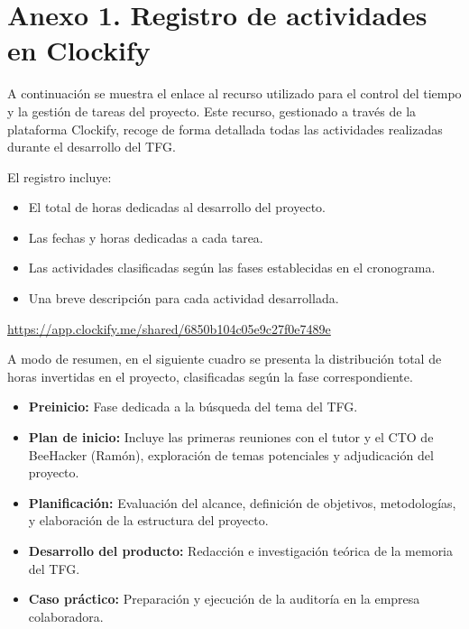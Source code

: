 \documentclass[a4paper, 11pt]{article}
\begin{document}
\thispagestyle{nohead}
\section*{Anexo 1. Registro de actividades en Clockify}
\label{anexo:1}

A continuación se muestra el enlace al recurso utilizado para el control del tiempo y la gestión de tareas del proyecto. Este recurso, gestionado a través de la plataforma Clockify, recoge de forma detallada todas las actividades realizadas durante el desarrollo del TFG. 

El registro incluye:
\begin{itemize}
  \item El total de horas dedicadas al desarrollo del proyecto.
  \item Las fechas y horas dedicadas a cada tarea.
  \item Las actividades clasificadas según las fases establecidas en el cronograma.
  \item Una breve descripción para cada actividad desarrollada.
\end{itemize}

\begin{tcolorbox}[enhanced,attach boxed title to top center={yshift=-3mm,yshifttext=-1mm},
  colback=blue!5!white,colframe=blue!75!black,colbacktitle=red!80!black,
  title=Dirección URL,fonttitle=\bfseries,
  boxed title style={size=small,colframe=red!50!black} ]
  \centering
  \url{https://app.clockify.me/shared/6850b104c05e9c27f0e7489e}

\end{tcolorbox}


A modo de resumen, en el siguiente cuadro se presenta la distribución total de horas invertidas en el proyecto, clasificadas según la fase correspondiente.

\begin{itemize}
    \item \textbf{Preinicio:} Fase dedicada a la búsqueda del tema del TFG.
    \item \textbf{Plan de inicio:} Incluye las primeras reuniones con el tutor y el CTO de BeeHacker (Ramón), exploración de temas potenciales y adjudicación del proyecto.
    \item \textbf{Planificación:} Evaluación del alcance, definición de objetivos, metodologías, y elaboración de la estructura del proyecto.
    \item \textbf{Desarrollo del producto:} Redacción e investigación teórica de la memoria del TFG.
    \item \textbf{Caso práctico:} Preparación y ejecución de la auditoría en la empresa colaboradora.
\end{itemize}
\end{document}
